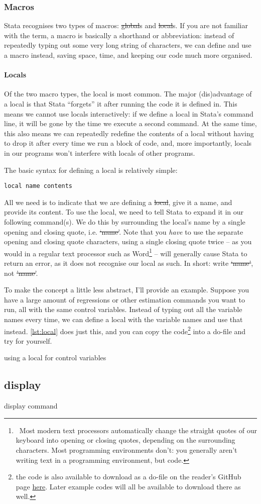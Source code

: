 \subsubsection{Macros}

Stata recognises two types of macros: \st{global}s and \st{local}s.
If you are not familiar with the term,
a macro is basically a shorthand or abbreviation:
instead of repeatedly typing out some very long string of characters,
we can define and use a macro instead, saving space, time,
and keeping our code much more organised.

\paragraph{Locals}
Of the two macro types, the local is most common.
The major (dis)advantage of a local is that Stata ``forgets'' it after running the code it is defined in.
This means we cannot use locals interactively:
if we define a local in Stata's command line,
it will be gone by the time we execute a second command.
At the same time,
this also means we can repeatedly redefine the contents of a local without having to drop it after every time we run a block of code,
and, more importantly, locals in our programs won't interfere with locals of other programs.

The basic syntax for defining a local is relatively simple:
\begin{verbatim}
local name contents
\end{verbatim}
All we need is to indicate that we are defining a \st{local}, give it a name,
and provide its content.
To use the local, we need to tell Stata to expand it in our following command(s).
We do this by surrounding the local's name by a single opening and closing quote, i.e. \st{`name'}.
Note that you \emph{have} to use the separate opening and closing quote characters,
using a single closing quote twice --
as you would in a regular text processor such as Word\footnote{%
~Most modern text processors automatically change the straight quotes of our keyboard into opening or closing quotes,
depending on the surrounding characters.
Most programming environments don't:
you generally aren't writing text in a programming environment, but code.} --
will generally cause Stata to return an error,
as it does not recognise our local as such.
In short: write \st{`name'}, not \st{'name'}.

To make the concept a little less abstract, I'll provide an example.
Suppose you have a large amount of regressions or other estimation commands you want to run,
all with the same control variables.
Instead of typing out all the variable names every time,
we can define a local with the variable names and use that instead.
\cref{lst:local} does just this, and you can copy the code\footnote{the code is also available to download as a do-file on the reader's GitHub page \href{https://github.com/Ahvns/ETPreader/tree/main/Example\%20do-files}{here}. Later example codes will all be available to download there as well.} into a do-file and try for yourself.

\begin{listing}[htp]
\caption{using a local for control variables}\label{lst:local}
\end{listing}
\subsection{display}

display command
